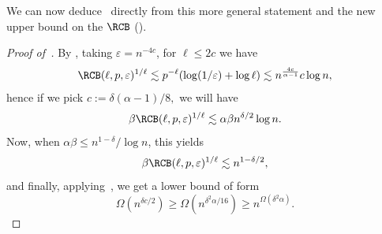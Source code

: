 We can now deduce~ directly from this more general statement and the new upper bound on the $\RCB$ ().
\begin{proof}[Proof of~]
By , taking $\varepsilon = n^{-4c}$, for $\ell \leq 2c$ we have
\begin{equation*}
    \RCB(\ell, p, \varepsilon)^{1/\ell} \lesssim p^{-\ell} (\log (1/\varepsilon) + \log \ell) \lesssim n^{\frac{4 c}{\alpha - 1}} c \log n,
\end{equation*}
hence if we pick $c := \delta (\alpha-1)/8,$
we will have
\begin{equation*}
    \beta \RCB(\ell, p, \varepsilon)^{1/\ell} \lesssim \alpha \beta n^{\delta/2} \log n.
\end{equation*}
Now, when $\alpha \beta \leq n^{1-\delta} / \log n$, this yields
\begin{equation*}
    \beta \RCB(\ell, p, \varepsilon)^{1/\ell} \lesssim n^{1-\delta/2},
\end{equation*}
and finally, applying~, we get a lower bound of form
\begin{equation*}
    \Omega(n^{\delta c /2}) \geq \Omega(n^{\delta^2 \alpha / 16}) \geq n^{\Omega(\delta^2 \alpha)}.
\end{equation*}
    
\end{proof}

\iffalse

